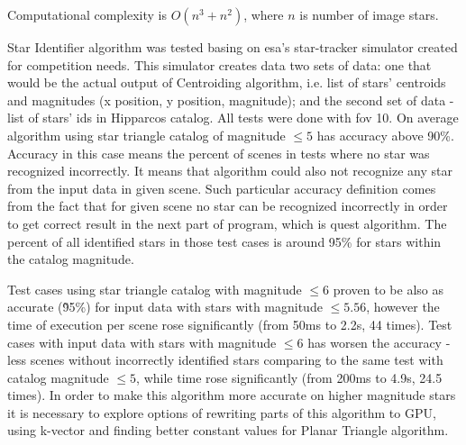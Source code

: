 \documentclass[12pt,a4paper,twoside]{article}
\begin{document}
Computational complexity is $O(n^3+n^2)$, where $n$ is number of image stars.

Star Identifier algorithm was tested basing on \gls{esa}'s star-tracker simulator created for competition needs\cite{esa-competition}. This simulator creates data two sets of data: one that would be the actual output of Centroiding algorithm, i.e. list of stars' centroids and magnitudes (x position, y position, magnitude); and the second set of data - list of stars' ids in Hipparcos catalog.
All tests were done with \gls{fov} 10\degree . On average algorithm using star triangle catalog of magnitude $\leqslant 5$ has accuracy above 90\%. Accuracy in this case means the percent of scenes in tests where no star was recognized incorrectly. It means that algorithm could also not recognize any star from the input data in given scene.
Such particular accuracy definition comes from the fact that for given scene no star can be recognized incorrectly in order to get correct result in the next part of program, which is \gls{quest} algorithm. The percent of all identified stars in those test cases is around 95\% for stars within the catalog magnitude.

Test cases using star triangle catalog with magnitude $\leqslant 6$ proven to be also as accurate (\~95\%) for input data with stars with magnitude $\leqslant 5.56$, however the time of execution per scene rose significantly (from 50ms to 2.2s, 44 times). Test cases with input data with stars with magnitude $\leqslant 6$ has worsen the accuracy - less scenes without incorrectly identified stars comparing to the same test with catalog magnitude $\leqslant 5$, while time rose significantly (from 200ms to 4.9s, 24.5 times). In order to make this algorithm more accurate on higher magnitude stars it is necessary to explore options of rewriting parts of this algorithm to GPU, using k-vector and finding better constant values for Planar Triangle algorithm.
\end{document}
